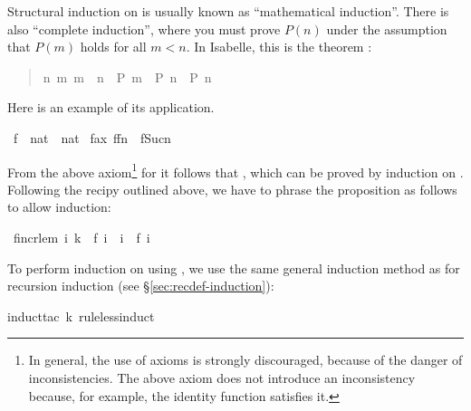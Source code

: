 \begin{isabelle}
\begin{isamarkuptext}
Structural induction on  is
usually known as ``mathematical induction''. There is also ``complete
induction'', where you must prove $P(n)$ under the assumption that $P(m)$
holds for all $m<n$. In Isabelle, this is the theorem :
\begin{quote}

\begin{isabelle}%
{\isacharparenleft}{\isasymAnd}\mbox{n}{\isachardot}\ {\isasymforall}\mbox{m}{\isachardot}\ \mbox{m}\ {\isacharless}\ \mbox{n}\ {\isasymlongrightarrow}\ \mbox{P}\ \mbox{m}\ {\isasymLongrightarrow}\ \mbox{P}\ \mbox{n}{\isacharparenright}\ {\isasymLongrightarrow}\ \mbox{P}\ \mbox{n}
\end{isabelle}%

\end{quote}
Here is an example of its application.%
\end{isamarkuptext}%
\ f\ {\isacharcolon}{\isacharcolon}\ {\isachardoublequote}nat\ {\isacharequal}{\isachargreater}\ nat{\isachardoublequote}\isanewline
{}\ f{\isacharunderscore}ax{\isacharcolon}\ {\isachardoublequote}f{\isacharparenleft}f{\isacharparenleft}n{\isacharparenright}{\isacharparenright}\ {\isacharless}\ f{\isacharparenleft}Suc{\isacharparenleft}n{\isacharparenright}{\isacharparenright}{\isachardoublequote}%
\begin{isamarkuptext}%
\noindent
From the above axiom\footnote{In general, the use of axioms is strongly
discouraged, because of the danger of inconsistencies. The above axiom does
not introduce an inconsistency because, for example, the identity function
satisfies it.}
for  it follows that , which can
be proved by induction on . Following the recipy outlined
above, we have to phrase the proposition as follows to allow induction:%
\end{isamarkuptext}%
\ f{\isacharunderscore}incr{\isacharunderscore}lem{\isacharcolon}\ {\isachardoublequote}{\isasymforall}i{\isachardot}\ k\ {\isacharequal}\ f\ i\ {\isasymlongrightarrow}\ i\ {\isasymle}\ f\ i{\isachardoublequote}%
\begin{isamarkuptxt}%
\noindent
To perform induction on  using , we use the same
general induction method as for recursion induction (see
\S\ref{sec:recdef-induction}):%
\end{isamarkuptxt}%
induct{\isacharunderscore}tac\ k\ rule{\isacharcolon}less{\isacharunderscore}induct{\isacharparenright}%

\end{isabelle}
